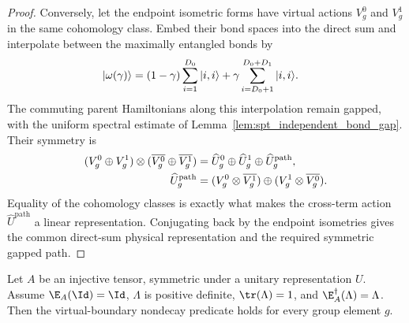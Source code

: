 \begin{proof}
    Conversely, let the endpoint isometric forms have virtual actions
    $V_g^0$ and $V_g^1$ in the same cohomology class.  Embed their bond spaces
    into the direct sum and interpolate between the maximally entangled bonds
    by
    \begin{align}
        |\omega(\gamma)\rangle
         & =(1-\gamma)\sum_{i=1}^{D_0}|i,i\rangle
        +\gamma\sum_{i=D_0+1}^{D_0+D_1}|i,i\rangle.
        \notag
    \end{align}
    The commuting parent Hamiltonians along this interpolation remain gapped,
    with the uniform spectral estimate of Lemma~\ref{lem:spt_independent_bond_gap}.
    Their symmetry is
    \begin{align}
        (V_g^0\oplus V_g^1)\otimes
        (\overline{V_g^0}\oplus\overline{V_g^1})
         & =\widehat U_g^0\oplus\widehat U_g^1
        \oplus\widehat U_g^{\mathrm{path}},    \\
        \widehat U_g^{\mathrm{path}}
         & =(V_g^0\otimes\overline{V_g^1})
        \oplus(V_g^1\otimes\overline{V_g^0}).
        \notag
    \end{align}
    Equality of the cohomology classes is exactly what makes the cross-term
    action $\widehat U^{\mathrm{path}}$ a linear representation.  Conjugating
    back by the endpoint isometries gives the common direct-sum physical
    representation and the required symmetric gapped path.
\end{proof}

\begin{theorem}%
    \label{thm:has_string_order_of_symmetric_injective}
    \leanok
    Let $A$ be an injective tensor, symmetric under a unitary
    representation $U$. Assume $\E_A(\Id)=\Id$, $\Lambda$ is positive
    definite, $\tr(\Lambda)=1$, and $\E_A^\dagger(\Lambda)=\Lambda$.
    Then the virtual-boundary nondecay predicate holds for every group
    element $g$.
\end{theorem}

